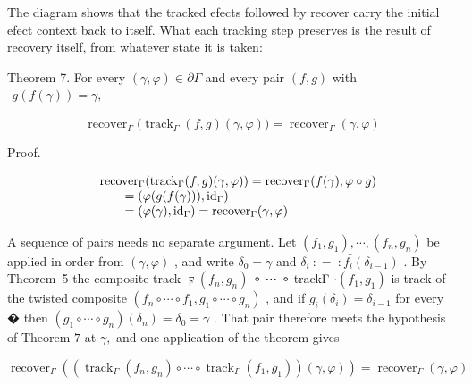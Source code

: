 \documentclass[
  10
]{article}
\begin{document}
The diagram shows that the tracked efects followed by recover carry the
initial efect context back to itself. What each tracking step preserves
is the result of recovery itself, from whatever state it is taken:

Theorem 7. For every \(( \gamma , \varphi ) \in \partial \Gamma\) and
every pair \(( f , g )\) with
\(\begin{array} { r } { g ( f ( \gamma ) ) = \gamma , } \end{array}\)

\[
\operatorname { r e c o v e r } _ { \Gamma } \bigl ( \operatorname { t r a c k } _ { \Gamma } ( f , g ) ( \gamma , \varphi ) \bigr ) = \operatorname { r e c o v e r } _ { \Gamma } ( \gamma , \varphi )\tag{10}
\]

Proof.

\[
\begin{array} { r l } & { \mathrm { r e c o v e r } _ { \Gamma } ( \mathrm { t r a c k } _ { \Gamma } ( f , g ) ( \gamma , \varphi ) ) = \mathrm { r e c o v e r } _ { \Gamma } ( f ( \gamma ) , \varphi \circ g ) } \\ & { \qquad = ( \varphi ( g ( f ( \gamma ) ) ) , \mathrm { i d } _ { \Gamma } ) } \\ & { \qquad = ( \varphi ( \gamma ) , \mathrm { i d } _ { \Gamma } ) = \mathrm { r e c o v e r } _ { \Gamma } ( \gamma , \varphi ) } \end{array}
\]

A sequence of pairs needs no separate argument. Let
\(( f _ { 1 } , g _ { 1 } ) , \cdots , ( f _ { n } , g _ { n } )\) be
applied in order from \(( \gamma , \varphi )\) , and write
\(\delta _ { 0 } = \gamma\) and
\(\bar { \delta _ { i } \ : = \ : f _ { i } ( \delta _ { i - 1 } ) }\) .
By Theorem~5 the composite track \(\digamma ( f _ { n } , g _ { n } )\)
∘ ⋯ ∘ trackΓ \(\cdot ( f _ { 1 } , g _ { 1 } )\) is track of the twisted
composite
\(( f _ { n } \circ \cdots \circ f _ { 1 } , g _ { 1 } \circ \cdots \circ g _ { n } )\)
, and if \(g _ { i } ( \delta _ { i } ) = \delta _ { i - 1 }\) for every
� then
\(( g _ { 1 } \circ \cdots \circ g _ { n } ) ( \delta _ { n } ) = \delta _ { 0 } = \gamma\)
. That pair therefore meets the hypothesis of Theorem \(7\) at
\(\gamma ,\) and one application of the theorem gives

\[
\operatorname { r e c o v e r } _ { \Gamma } ( ( \operatorname { t r a c k } _ { \Gamma } ( f _ { n } , g _ { n } ) \circ \dotsb \circ \operatorname { t r a c k } _ { \Gamma } ( f _ { 1 } , g _ { 1 } ) ) ( \gamma , \varphi ) ) = \operatorname { r e c o v e r } _ { \Gamma } ( \gamma , \varphi )\tag{11}
\]
\end{document}
